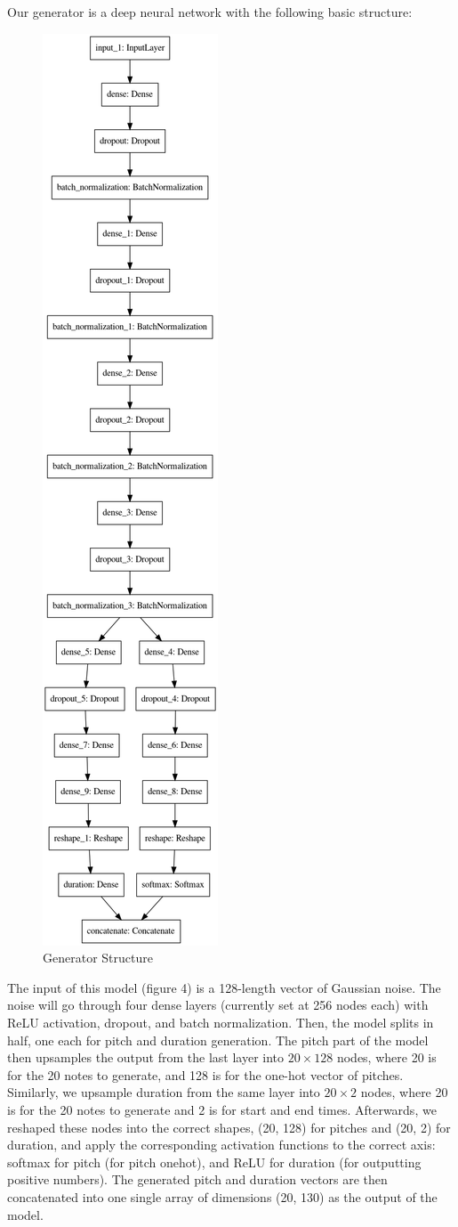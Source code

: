 \documentclass[12pt,oneside]{chicagocapstone}
\begin{document}
Our generator is a deep neural network with the following basic structure:
\begin{figure}

{\centering \includegraphics[width=0.3\linewidth]{figure/gen_model} 

}

\caption{Generator Structure}\label{fig:unnamed-chunk-5}
\end{figure}
The input of this model (figure 4) is a 128-length vector of Gaussian noise. The noise will go through four dense layers (currently set at 256 nodes each) with ReLU activation, dropout, and batch normalization. Then, the model splits in half, one each for pitch and duration generation. The pitch part of the model then upsamples the output from the last layer into \(20\times128\) nodes, where 20 is for the 20 notes to generate, and 128 is for the one-hot vector of pitches. Similarly, we upsample duration from the same layer into \(20\times2\) nodes, where 20 is for the 20 notes to generate and 2 is for start and end times. Afterwards, we reshaped these nodes into the correct shapes, (20, 128) for pitches and (20, 2) for duration, and apply the corresponding activation functions to the correct axis: softmax for pitch (for pitch onehot), and ReLU for duration (for outputting positive numbers). The generated pitch and duration vectors are then concatenated into one single array of dimensions (20, 130) as the output of the model.
\end{document}
